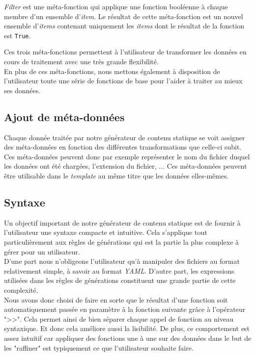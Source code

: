 		\textit{Filter} est une méta-fonction qui applique une fonction booléenne à chaque membre d'un ensemble d'\textit{item}. Le résultat de cette méta-fonction est un nouvel ensemble d'\textit{items} contenant uniquement les \textit{items} dont le résultat de la fonction est \texttt{True}.
		
		Ces trois méta-fonctions permettent à l'utilisateur de transformer les données en cours de traitement avec une très grande flexibilité.\\
		
		En plus de ces méta-fonctions, nous mettons également à disposition de l'utilisateur toute une série de fonctions de base pour l'aider à traiter au mieux ses données.
	
	\subsection{Ajout de méta-données}
	
		Chaque donnée traitée par notre générateur de contenu statique se voit assigner des méta-données en fonction des différentes transformations que celle-ci subit. Ces méta-données peuvent donc par exemple représenter le nom du fichier duquel les données ont été chargées, l'extension du fichier, ... Ces méta-données peuvent être utilisable dans le \textit{template} au même titre que les données elles-mêmes.
		
	\subsection*{Syntaxe}
	
		Un objectif important de notre générateur de contenu statique est de fournir à l'utilisateur une syntaxe compacte et intuitive. Cela s'applique tout particulièrement aux règles de générations qui est la partie la plus complexe à gérer pour un utilisateur.\\
		
		D'une part nous n'obligeons l'utilisateur qu'à manipuler des fichiers au format relativement simple, à savoir au format \textit{YAML}. D'autre part, les expressions utilisées dans les règles de générations constituent une grande partie de cette complexité.\\
		
		Nous avons donc choisi de faire en sorte que le résultat d'une fonction soit automatiquement passée en paramètre à la fonction suivante grâce à l'opérateur ">>". Cela permet ainsi de bien séparer chaque appel de fonction au niveau syntaxique. Et donc cela améliore aussi la lisibilité. De plus, ce comportement est assez intuitif car appliquer des fonctions une à une sur des données dans le but de les "raffiner" est typiquement ce que l'utilisateur souhaite faire.\\
		
